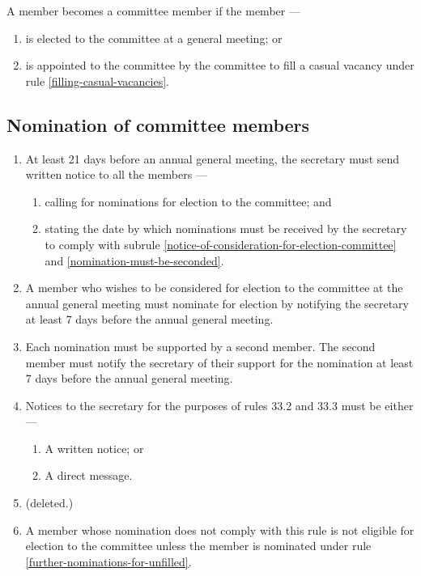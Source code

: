 \documentclass[../constitution.tex]{subfiles}
\begin{document}
A member becomes a committee member if the member ---

\begin{enumerate}

  \item is elected to the committee at a general meeting; or
  \item is appointed to the committee by the committee to fill a casual vacancy under rule \ref{filling-casual-vacancies}.
\end{enumerate}

\hypertarget{nomination-of-committee-members}{%
  \subsection{Nomination of committee members}\label{nomination-of-committee-members}}

\begin{enumerate}

  \item At least 21 days before an annual general meeting, the secretary must send written notice to all the members ---

        \begin{enumerate}

          \item calling for nominations for election to the committee; and
          \item stating the date by which nominations must be received by the secretary to comply with subrule \ref{notice-of-consideration-for-election-committee} and \ref{nomination-must-be-seconded}.
        \end{enumerate}
  \item A member who wishes to be considered for election to the committee at the annual general meeting must nominate for election by notifying the secretary at least 7 days before the annual general meeting. \label{notice-of-consideration-for-election-committee}
  \item Each nomination must be supported by a second member. The second member must notify the secretary of their support for the nomination at least 7 days before the annual general meeting. \label{nomination-must-be-seconded}
  \item Notices to the secretary for the purposes of rules 33.2 and 33.3 must be either ---

        \begin{enumerate}
          \item A written notice; or
          \item A direct message.
        \end{enumerate}

  \item (deleted.)
  \item A member whose nomination does not comply with this rule is not eligible for election to the committee unless the member is nominated under rule \ref{further-nominations-for-unfilled}.
\end{enumerate}
\end{document}
